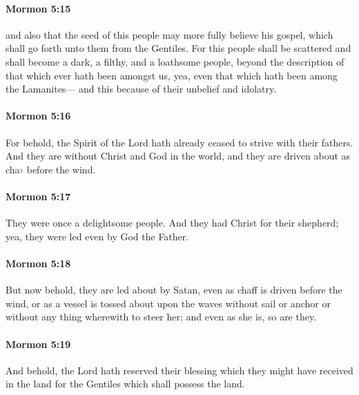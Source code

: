 		\paragraph{Mormon 5:15} %
			\label{MORMON-5-15}

			and also that the seed of this people may more fully believe his gospel,
			which shall go forth unto them from the Gentiles.
			For this people shall be scattered
			and shall become a dark, a filthy, and a loathsome people,
			beyond the description of that which ever hath been amongst us,
			yea, even that which hath been among the Lamanites---
			and this because of their unbelief and idolatry.

		\paragraph{Mormon 5:16} %
			\label{MORMON-5-16}

			For behold, the Spirit of the Lord hath already ceased to strive with their fathers.
			And they are without Christ and God in the world,
			and they are driven about as cha› before the wind.

		\paragraph{Mormon 5:17} %
			\label{MORMON-5-17}

			They were once a delightsome people.
			And they had Christ for their shepherd;
			yea, they were led even by God the Father.

		\paragraph{Mormon 5:18} %
			\label{MORMON-5-18}

			But now behold, they are led about by Satan,
			even as chaff is driven before the wind,
			or as a vessel is tossed about upon the waves without sail or anchor
			or without any thing wherewith to steer her;
			and even as she is, so are they.

		\paragraph{Mormon 5:19} %
			\label{MORMON-5-19}

			And behold, the Lord hath reserved their blessing
			which they might have received in the land
			for the Gentiles which shall possess the land.

